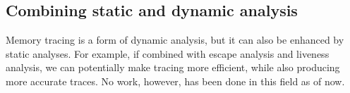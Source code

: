 \subsection{Combining static and dynamic analysis}
Memory tracing is a form of dynamic analysis, but it can also be enhanced by static analyses. For example, if combined with escape analysis and liveness
analysis, we can potentially make tracing more efficient, while also producing more accurate traces. No work, however, has been done in this
field as of now.
